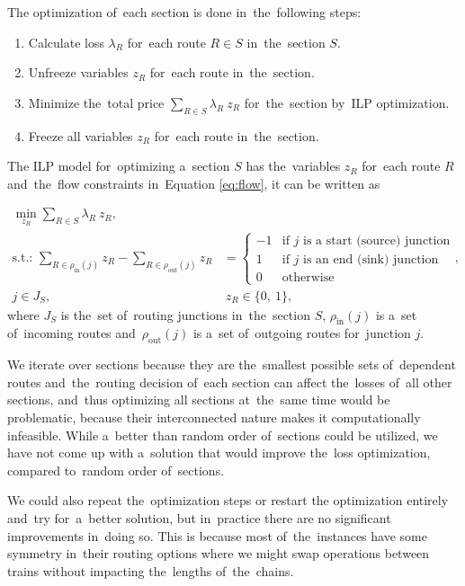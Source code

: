 The optimization of~each section is done in~the~following steps:
\begin{enumerate}
  \item Calculate loss $\lambda_R$ for~each route $R \in S$ in~the~section $S$.
  \item Unfreeze variables $z_R$ for~each route in~the~section.
  \item Minimize the~total price $\sum_{R \in S} \lambda_R\ z_R$ for~the~section by~ILP optimization.
  \item Freeze all variables $z_R$ for~each route in~the~section.
\end{enumerate}

The ILP model for~optimizing a~section $S$ has the~variables $z_R$ for~each route $R$ and~the~flow constraints in~Equation \ref{eq:flow}, it can be written as

\begin{align}
  \min_{z_R} \sum_{R \in S} \lambda_R\ z_R,\\
  \text{s.t.: }\sum_{R \in \rho_{\mathrm{in}}(j)} z_R - \sum_{R \in \rho_{\mathrm{out}}(j)} z_R &= \begin{cases}
    -1 & \text{if $j$ is a~start (source) junction} \\
    1 & \text{if $j$ is an~end (sink) junction} \\
    0 & \text{otherwise}
\end{cases}, \\
  j \in J_S,&\ z_R \in \{0,\ 1\},
\end{align}
where  $J_S$ is the~set of~routing junctions in~the~section $S$, $\rho_{\mathrm{in}}(j)$ is a~set of~incoming routes and~$\rho_{\mathrm{out}}(j)$ is a~set of~outgoing routes for~junction $j$.

We iterate over sections because they are the~smallest possible sets of~dependent routes and~the~routing decision of~each section can affect the~losses of~all other sections, and~thus optimizing all sections at~the~same time would be problematic, because their interconnected nature makes it computationally infeasible. While a~better than random order of~sections could be utilized, we have not come up with a~solution that would improve the~loss optimization, compared to~random order of~sections.

We could also repeat the~optimization steps or restart the optimization entirely and~try for~a~better solution, but in~practice there are no significant improvements in~doing so. This is because most of~the~instances have some symmetry in~their routing options where we might swap operations between trains without impacting the~lengths of~the~chains.

